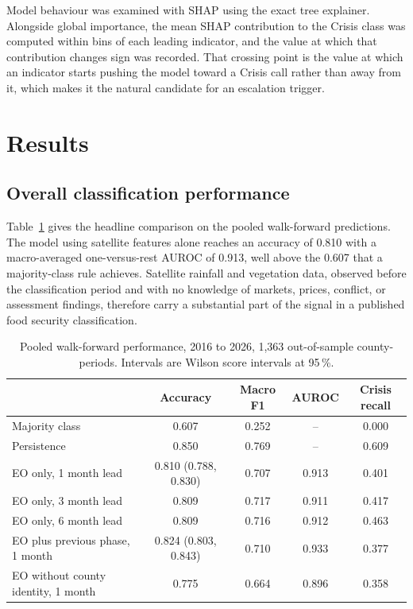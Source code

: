 \documentclass[11pt]{article}
\begin{document}
Model behaviour was examined with SHAP \cite{lundberg2017} using the exact tree
explainer. Alongside global importance, the mean SHAP contribution to the
Crisis class was computed within bins of each leading indicator, and the value at
which that contribution changes sign was recorded. That crossing point is the
value at which an indicator starts pushing the model toward a Crisis call rather
than away from it, which makes it the natural candidate for an escalation
trigger.

\section{Results}
\label{sec:results}

\subsection{Overall classification performance}

Table~\ref{tab:main} gives the headline comparison on the pooled walk-forward
predictions. The model using satellite features alone reaches an accuracy of
0.810 with a macro-averaged one-versus-rest AUROC of 0.913, well above the 0.607
that a majority-class rule achieves. Satellite rainfall and vegetation data, observed
before the classification period and with no knowledge of markets, prices,
conflict, or assessment findings, therefore carry a substantial part of the
signal in a published food security classification.

\begin{table}[h]
\centering
\caption{Pooled walk-forward performance, 2016 to 2026, 1,363 out-of-sample
county-periods. Intervals are Wilson score intervals at 95\,\%.}
\label{tab:main}
\small
\begin{tabular}{lcccc}
\toprule
 & Accuracy & Macro F1 & AUROC & Crisis recall \\
\midrule
Majority class          & 0.607 & 0.252 & --    & 0.000 \\
Persistence             & 0.850 & 0.769 & --    & 0.609 \\
EO only, 1 month lead   & 0.810 (0.788, 0.830) & 0.707 & 0.913 & 0.401 \\
EO only, 3 month lead   & 0.809 & 0.717 & 0.911 & 0.417 \\
EO only, 6 month lead   & 0.809 & 0.716 & 0.912 & 0.463 \\
EO plus previous phase, 1 month & 0.824 (0.803, 0.843) & 0.710 & 0.933 & 0.377 \\
EO without county identity, 1 month & 0.775 & 0.664 & 0.896 & 0.358 \\
\bottomrule
\end{tabular}
\end{table}
\end{document}
